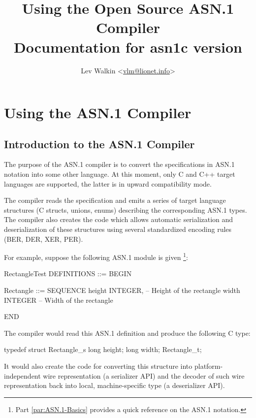 \documentclass[english,oneside,12pt]{book}
\begin{document}
\title{Using the Open Source ASN.1 Compiler\\
\vspace*{0.4cm}
\Large Documentation for asn1c version \asnver{}}
\author{Lev Walkin <\href{mailto:vlm@lionet.info?Subject=asn1c}{vlm@lionet.info}>}

\pagestyle{fancy}
\fancyhead[L]{\leftmark}
\maketitle

\tableofcontents{}

\part{Using the ASN.1 Compiler}


\chapter{Introduction to the ASN.1 Compiler}

The purpose of the ASN.1 compiler is to convert the specifications
in ASN.1 notation into some other language. At this moment, only C
and C++ target languages are supported, the latter is in upward compatibility
mode.

The compiler reads the specification and emits a series of target
language structures (C structs, unions, enums) describing the corresponding
ASN.1 types. The compiler also creates the code which allows automatic
serialization and deserialization of these structures using several
standardized encoding rules (BER, DER, XER, PER).

For example, suppose the following ASN.1 module is given%
\footnote{Part \ref{par:ASN.1-Basics} provides a quick reference
on the ASN.1 notation.}:
\begin{asn}
RectangleTest DEFINITIONS ::= BEGIN

Rectangle ::= SEQUENCE {
    height  INTEGER,        -- Height of the rectangle
    width   INTEGER         -- Width of the rectangle
}

END
\end{asn}
The compiler would read this ASN.1 definition and produce the following
C type:
\begin{codesample}
typedef struct Rectangle_s {
    long height;
    long width;
} Rectangle_t;
\end{codesample}
It would also create the code for converting this structure into platform-independent
wire representation (a serializer API) and the decoder of such wire
representation back into local, machine-specific type (a deserializer
API).
\end{document}
